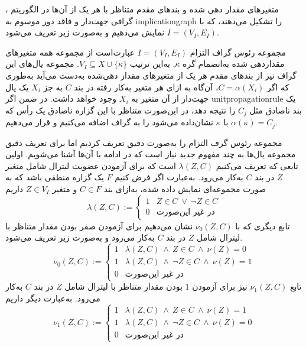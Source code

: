 متغیرهای مقدار دهی شده و بندهای مقدم متناظر با هر یک از آن‌ها  در الگوریتم 
، 
گرافی جهت‌دار و فاقد دور  موسوم به 
\gls*{implicationgraph}
را تشکیل  می‌دهند، که با 
$I = (V_{I}, E_{I})$
نمایش می‌دهیم و به‌صورت زیر تعریف می‌شود. 
\begin{definition}
مجموعه رئوس گراف التزام 
$I = (V_{I}, E_{I})$
 عبارت‌است از مجموعه همه متغیرهای مقداردهی شده به‌انضمام گره 
 $\kappa$, 
 به‌این ترتیب 
 $V_{I}\subseteq X\cup\{\kappa\}$.
مجموعه یال‌های این گراف نیز از بندهای مقدم هر یک از متغیرهای مقدار دهی‌شده به‌دست می‌آید به‌طوری که اگر 
$C = \alpha(X_{i})$، 
آن‌گاه به ازای هر متغیر  به‌کار رفته در بند 
$C$
به جز 
$X_{i}$ 
یک یال جهت‌دار از آن متغیر به 
 $X_{i}$
 وجود خواهد داشت.  در ضمن اگر 
 \gls*{unitpropagationrule} 
 یک بند ناصادق مثل 
 $C_{j}$
 را نتیجه دهد، در این‌صورت  متناظر با این گزاره  ناصادق یک رأس که با 
 $\kappa$
 نشان‌داده می‌شود را به گراف اضافه می‌کنیم  و قرار می‌دهیم 
 $\alpha(\kappa)   = C_{j}$.
\end{definition}
مجموعه رئوس گرف التزام را به‌صورت دقیق تعریف کردیم اما برای تعریف دقیق مجموعه یال‌ها به چند مفهوم جدید نیاز است که در ادامه با آن‌ها آشنا می‌شویم.  اولین تابعی که تعریف می‌کنیم 
$\lambda(Z, C)$
است که برای آزمودن عضویت لیترال شامل متغیر 
$Z$
در بند
$C$
به‌کار می‌رود.  به‌عبارت اگر فرض کنیم 
$F$
یک گزاره منطقی باشد که به صورت مجموعه‌ای نمایش داده شده، به‌ازای بند 
$C\in F$
و متغیر 
$Z\in V_{I}$
داریم 
\begin{equation*}
\lambda(Z, C):= \left\{
\begin{array}{ll}
1& Z\in C \ \vee \ \neg Z\in C\\
0 & \text{در غیر این‌صورت}
\end{array}
\right.
\end{equation*}
تابع دیگری که با 
$\nu_{0}(Z, C)$
نشان می‌دهیم برای آزمودن صفر بودن مقدار متناظر با لیترال شامل 
$Z$
در بند 
$C$
به‌کار می‌رود و به‌صورت زیر تعریف می‌شود. 
\begin{equation*}
\nu_{0}(Z, C):= \left\{
\begin{array}{ll}
1& \lambda(Z, C) \ \wedge \ Z\in C \ \wedge \  \nu(Z) = 0\\
1&  \lambda(Z, C) \ \wedge \ \neg Z\in C \ \wedge   \ \nu(Z) = 1\\
0 & \text{در غیر این‌صورت}
\end{array}
\right.
\end{equation*}
تابع 
$\nu_{1}(Z, C)$
نیز برای آزمودن 
$1$
بودن مقدار متناظر با لیترال شامل 
$Z$
در بند
$C$
به‌کار می‌رود. به‌عبارت دیگر داریم 
\begin{equation*}
\nu_{1}(Z, C):= \left\{
\begin{array}{ll}
1& \lambda(Z, C) \ \wedge \ Z\in C \ \wedge \ \nu(Z) = 1\\
1&  \lambda(Z, C) \ \wedge \ \neg Z\in C \ \wedge \ \nu(Z) = 0\\
0 & \text{در غیر این‌صورت}
\end{array}
\right.
\end{equation*}
